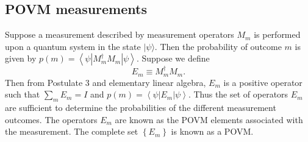 \subsection{POVM measurements}
Suppose a measurement described by measurement operators $M_{m}$ is performed upon a quantum system in the state $|\psi\rangle$. Then the probability of outcome $m$ is given by $p(m)=\left\langle\psi\left|M_{m}^{\dagger} M_{m}\right| \psi\right\rangle$. Suppose we define
\begin{equation}
E_{m} \equiv M_{m}^{\dagger} M_{m}.
\end{equation}
Then from Postulate 3 and elementary linear algebra, $E_{m}$ is a positive operator such that $\sum_{m} E_{m}=I$ and $p(m)=\left\langle\psi\left|E_{m}\right| \psi\right\rangle$. Thus the set of operators $E_{m}$ are sufficient to determine the probabilities of the different measurement outcomes. The operators $E_{m}$ are known as the POVM elements associated with the measurement. The complete set $\left\{E_{m}\right\}$ is known as a POVM.
